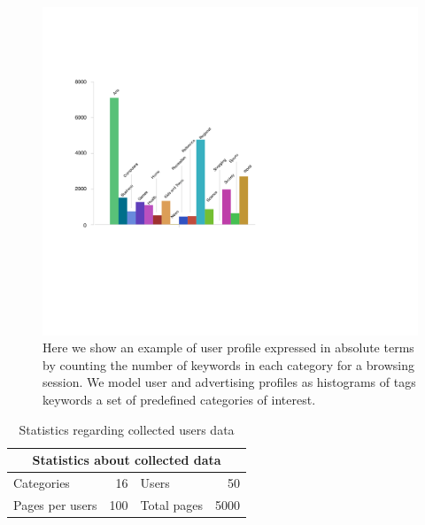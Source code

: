\begin{figure}  
\includegraphics[width=\textwidth]{figures/absolute-population-profile-eps-converted-to.pdf}
\caption[A user's profile]{Here we show an example of user profile expressed in absolute terms by counting the number of keywords in each category for a browsing session. We model user and advertising profiles as histograms of tags keywords a set of predefined categories of interest.
\label{fig:abs-profile}}
\end{figure}

\begin{table}[htbp]
\centering
\caption{Statistics regarding collected users data \label{table:DatasetStats}}
\def\arraystretch{2.5}
\begin{tabular}{| l | r | l | r | }
\hline
\multicolumn{4}{|c|}{Statistics about collected data}            \\[2.5mm] \hline
Categories               & 16    & Users                   & 50   \\[2.5mm] \hline
Pages per users    & 100 & Total pages      & 5000 \\[2.5mm] \hline
\end{tabular}
\end{table}

